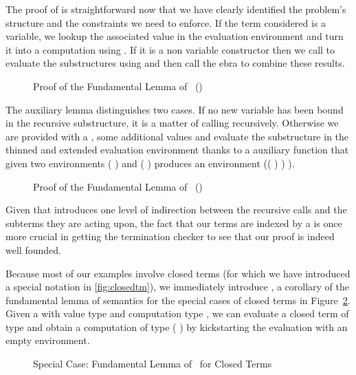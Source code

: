 The proof of  is straightforward now that we have clearly identified the
problem's structure and the constraints we need to enforce. If the term considered
is a variable, we lookup the associated value in the evaluation environment and
turn it into a computation using . If it is a non variable constructor
then we call  to evaluate the substructures using  and then
call the ebra to combine these results.

\begin{figure}[h]
\caption{Proof of the Fundamental Lemma of ~()}
\end{figure}

The auxiliary lemma  distinguishes two cases. If no new variable has
been bound in the recursive substructure, it is a matter of calling 
recursively. Otherwise we are provided with a , some additional
values and evaluate the substructure in the thinned and extended evaluation
environment thanks to a auxiliary function 
that given two environments
{( )  } and {( )  }
produces an environment {(( \AF{++} ) )  )}.

\begin{figure}[h]
\caption{Proof of the Fundamental Lemma of ~()\label{fig:genbody}}
\end{figure}

Given that  introduces one level of indirection between the recursive
calls and the subterms they are acting upon, the fact that our terms are indexed
by a  is once more crucial in getting the termination checker to see
that our proof is indeed well founded.

Because most of our examples involve closed terms (for which we have
introduced a special notation in \cref{fig:closedtm}), we immediately
introduce , a corollary of the fundamental lemma of semantics
for the special cases of closed terms in Figure~\ref{fig:closedsem}.
Given a  with value type  and computation type ,
we can evaluate a closed term of type  and obtain a computation of
type {(  \AIC{[]})} by kickstarting the evaluation with an
empty environment.

\begin{figure}[h]
\caption{Special Case: Fundamental Lemma of ~for Closed Terms\label{fig:closedsem}}
\end{figure}


